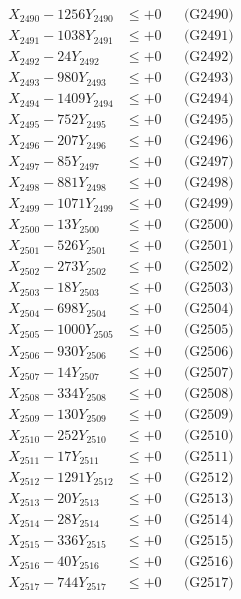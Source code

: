 \documentclass[a4paper,10pt]{article}
\begin{document}
{\begin{align}
X_{2490} - 1256Y_{2490} &\leq +0 && \text{(G2490)} \\
\allowbreak
X_{2491} - 1038Y_{2491} &\leq +0 && \text{(G2491)} \\
X_{2492} - 24Y_{2492} &\leq +0 && \text{(G2492)} \\
X_{2493} - 980Y_{2493} &\leq +0 && \text{(G2493)} \\
X_{2494} - 1409Y_{2494} &\leq +0 && \text{(G2494)} \\
X_{2495} - 752Y_{2495} &\leq +0 && \text{(G2495)} \\
X_{2496} - 207Y_{2496} &\leq +0 && \text{(G2496)} \\
X_{2497} - 85Y_{2497} &\leq +0 && \text{(G2497)} \\
X_{2498} - 881Y_{2498} &\leq +0 && \text{(G2498)} \\
X_{2499} - 1071Y_{2499} &\leq +0 && \text{(G2499)} \\
X_{2500} - 13Y_{2500} &\leq +0 && \text{(G2500)} \\
\allowbreak
X_{2501} - 526Y_{2501} &\leq +0 && \text{(G2501)} \\
X_{2502} - 273Y_{2502} &\leq +0 && \text{(G2502)} \\
X_{2503} - 18Y_{2503} &\leq +0 && \text{(G2503)} \\
X_{2504} - 698Y_{2504} &\leq +0 && \text{(G2504)} \\
X_{2505} - 1000Y_{2505} &\leq +0 && \text{(G2505)} \\
X_{2506} - 930Y_{2506} &\leq +0 && \text{(G2506)} \\
X_{2507} - 14Y_{2507} &\leq +0 && \text{(G2507)} \\
X_{2508} - 334Y_{2508} &\leq +0 && \text{(G2508)} \\
X_{2509} - 130Y_{2509} &\leq +0 && \text{(G2509)} \\
X_{2510} - 252Y_{2510} &\leq +0 && \text{(G2510)} \\
\allowbreak
X_{2511} - 17Y_{2511} &\leq +0 && \text{(G2511)} \\
X_{2512} - 1291Y_{2512} &\leq +0 && \text{(G2512)} \\
X_{2513} - 20Y_{2513} &\leq +0 && \text{(G2513)} \\
X_{2514} - 28Y_{2514} &\leq +0 && \text{(G2514)} \\
X_{2515} - 336Y_{2515} &\leq +0 && \text{(G2515)} \\
X_{2516} - 40Y_{2516} &\leq +0 && \text{(G2516)} \\
X_{2517} - 744Y_{2517} &\leq +0 && \text{(G2517)} \\

\end{align}}
\end{document}
